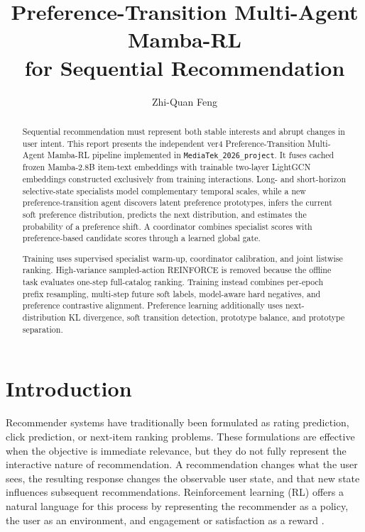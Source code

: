 \documentclass[11pt,a4paper]{article}
\title{\textbf{Preference-Transition Multi-Agent Mamba-RL\\for Sequential Recommendation}}
\author{Zhi-Quan Feng}
\date{}
\newcommand{\Project}{\texttt{MediaTek\_2026\_project}}
\begin{document}
\maketitle

\begin{abstract}
Sequential recommendation must represent both stable interests and abrupt changes in user intent. This report presents the independent ver4 Preference-Transition Multi-Agent Mamba-RL pipeline implemented in \Project. It fuses cached frozen Mamba-2.8B item-text embeddings with trainable two-layer LightGCN embeddings constructed exclusively from training interactions. Long- and short-horizon selective-state specialists model complementary temporal scales, while a new preference-transition agent discovers latent preference prototypes, infers the current soft preference distribution, predicts the next distribution, and estimates the probability of a preference shift. A coordinator combines specialist scores with preference-based candidate scores through a learned global gate.

Training uses supervised specialist warm-up, coordinator calibration, and
joint listwise ranking. High-variance sampled-action REINFORCE is removed
because the offline task evaluates one-step full-catalog ranking. Training
instead combines per-epoch prefix resampling, multi-step future soft labels,
model-aware hard negatives, and preference contrastive alignment. Preference
learning additionally uses next-distribution KL divergence, soft transition
detection, prototype balance, and prototype separation.
\end{abstract}

\section{Introduction}

Recommender systems have traditionally been formulated as rating prediction, click prediction, or next-item ranking problems. These formulations are effective when the objective is immediate relevance, but they do not fully represent the interactive nature of recommendation. A recommendation changes what the user sees, the resulting response changes the observable user state, and that new state influences subsequent recommendations. Reinforcement learning (RL) offers a natural language for this process by representing the recommender as a policy, the user as an environment, and engagement or satisfaction as a reward \cite{RLSURVEY}.
\end{document}
